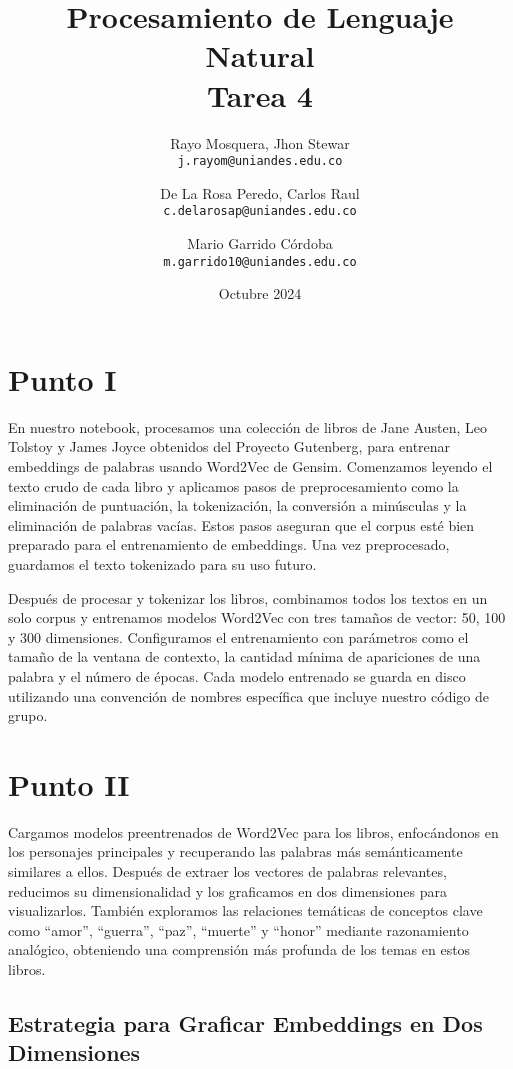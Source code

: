 \documentclass[11pt,english]{article}
\title{Procesamiento de Lenguaje Natural\\
Tarea 4
}
\author{
  Rayo Mosquera, Jhon Stewar\\
  \texttt{j.rayom@uniandes.edu.co}
  \and
  De La Rosa Peredo, Carlos Raul\\
  \texttt{c.delarosap@uniandes.edu.co}\and
  Mario Garrido Córdoba\\
   \texttt{m.garrido10@uniandes.edu.co}
  \\ 
}
\date{Octubre 2024}
\theoremstyle{plain}
\begin{document}
\maketitle

\section*{Punto I}

En nuestro notebook, procesamos una colección de libros de Jane Austen, Leo Tolstoy y James Joyce obtenidos del Proyecto Gutenberg, para entrenar embeddings de palabras usando Word2Vec de Gensim. Comenzamos leyendo el texto crudo de cada libro y aplicamos pasos de preprocesamiento como la eliminación de puntuación, la tokenización, la conversión a minúsculas y la eliminación de palabras vacías. Estos pasos aseguran que el corpus esté bien preparado para el entrenamiento de embeddings. Una vez preprocesado, guardamos el texto tokenizado para su uso futuro.

Después de procesar y tokenizar los libros, combinamos todos los textos en un solo corpus y entrenamos modelos Word2Vec con tres tamaños de vector: 50, 100 y 300 dimensiones. Configuramos el entrenamiento con parámetros como el tamaño de la ventana de contexto, la cantidad mínima de apariciones de una palabra y el número de épocas. Cada modelo entrenado se guarda en disco utilizando una convención de nombres específica que incluye nuestro código de grupo.

\section*{Punto II}

Cargamos modelos preentrenados de Word2Vec para los libros, enfocándonos en los personajes principales y recuperando las palabras más semánticamente similares a ellos. Después de extraer los vectores de palabras relevantes, reducimos su dimensionalidad y los graficamos en dos dimensiones para visualizarlos. También exploramos las relaciones temáticas de conceptos clave como ``amor'', ``guerra'', ``paz'', ``muerte'' y ``honor'' mediante razonamiento analógico, obteniendo una comprensión más profunda de los temas en estos libros.

\subsection*{Estrategia para Graficar Embeddings en Dos Dimensiones}
\end{document}
